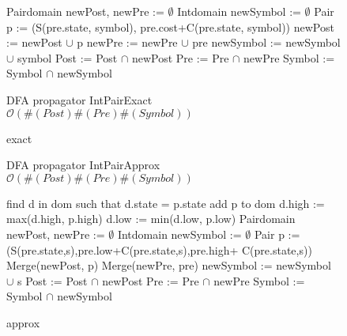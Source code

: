 \begin{figure}[H]
\begin{algorithm}[H]
\begin{algorithmic}[1]
\State Pairdomain newPost, newPre := $\emptyset$
\State Intdomain newSymbol := $\emptyset$
		\State Pair p := (S(pre.state, symbol), pre.cost+C(pre.state, symbol))
			\State newPost := newPost $\cup$ p
			\State newPre := newPre $\cup$ pre
			\State newSymbol := newSymbol $\cup$ symbol 
		\EndIf
	\EndFor
\EndFor
\State Post := Post $\cap$ newPost
\State Pre := Pre $\cap$ newPre
\State Symbol := Symbol $\cap$ newSymbol
\EndProcedure
\end{algorithmic}
\caption{DFA propagator IntPairExact \newline $\mathcal{O}(\#(Post)\#(Pre)\#(Symbol))$}
\end{algorithm}
\caption{exact}\label{fig:algexact}
\end{figure}
\begin{figure}[H]
\begin{algorithm}[H]
\caption{DFA propagator IntPairApprox\newline $\mathcal{O}(\#(Post)\#(Pre)\#(Symbol))$}
\begin{algorithmic}[1]
	\State find d in dom such that d.state = p.state
		\State add p to dom
	\Else	
		\State d.high := max(d.high, p.high)
		\State d.low := min(d.low, p.low)
	\EndIf
\EndProcedure
{}
\State Pairdomain newPost, newPre := $\emptyset$
\State Intdomain newSymbol := $\emptyset$
		\State Pair p :=(S(pre.state,s),pre.low+C(pre.state,s),pre.high+ C(pre.state,s))
			\State Merge(newPost, p)
			\State Merge(newPre, pre)
			\State newSymbol := newSymbol $\cup$ s
		\EndIf
	\EndFor
\EndFor
\State Post := Post $\cap$ newPost
\State Pre := Pre $\cap$ newPre
\State Symbol := Symbol $\cap$ newSymbol
\EndProcedure
\end{algorithmic}
\end{algorithm}
\caption{approx}\label{fig:algapprox}
\end{figure}